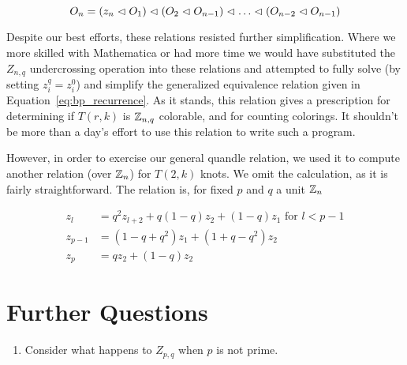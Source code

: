 \documentclass[paper.tex]{subfiles}
\begin{document}
\begin{equation}
   O_n = (z_n \vartriangleleft O_1) \vartriangleleft (O_2 \vartriangleleft O_{n -1}) \vartriangleleft \ldots \vartriangleleft (O_{n - 2} \vartriangleleft O_{n - 1})
\end{equation}

Despite our best efforts, these relations resisted further simplification. Where we more skilled with Mathematica or had more time we would have substituted the $Z_{n,q}$ undercrossing operation into these relations
     and attempted to fully solve (by setting $z^q_{i} = z^0_{i}$) and simplify the generalized equivalence relation given in Equation~\ref{eq:bp_recurrence}. As it stands, this relation gives a prescription for
     determining if $T(r,k)$ is $\mathbb{Z}_{n,q}$ colorable, and for counting colorings. It shouldn't be more than a day's effort to use this relation to write such a program.

However, in order to exercise our general quandle relation, we used it to compute another relation (over $\mathbb{Z}_n$) for $T(2, k)$ knots. We omit the calculation, as it is fairly straightforward. The relation is, for fixed $p$
      and $q$ a unit $\mathbb{Z}_n$

\begin{align}
    z_l &= q^2 z_{l + 2} + q(1 - q) z_2 + (1 - q) z_1 \text{ for } l < p -1\\
    z_{p - 1} &= (1 - q + q^2) z_1 + (1 + q - q^2) z_2 \\
    z_p  &= q z_2 + (1 - q) z_2
\end{align}

\section{Further Questions}\label{fqs}

\begin{enumerate}
\item Consider what happens to $Z_{p,q}$ when $p$ is not prime.
\end{enumerate}
\end{document}
